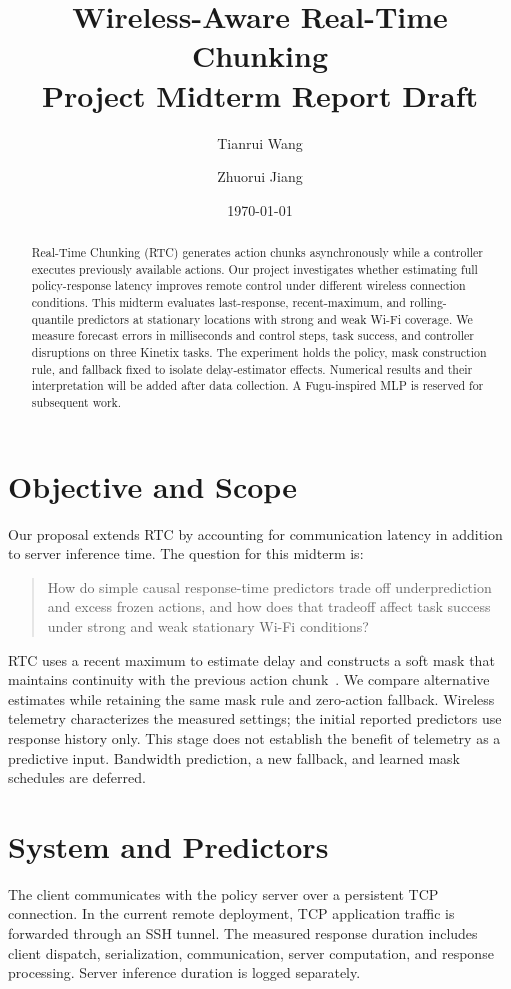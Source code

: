 \documentclass[11pt]{article}
\title{Wireless-Aware Real-Time Chunking\\Project Midterm Report Draft}
\author{Tianrui Wang \and Zhuorui Jiang}
\date{\today}
\begin{document}
\maketitle

\begin{abstract}
Real-Time Chunking (RTC) generates action chunks asynchronously while a controller executes previously available actions. Our project investigates whether estimating full policy-response latency improves remote control under different wireless connection conditions. This midterm evaluates last-response, recent-maximum, and rolling-quantile predictors at stationary locations with strong and weak Wi-Fi coverage. We measure forecast errors in milliseconds and control steps, task success, and controller disruptions on three Kinetix tasks. The experiment holds the policy, mask construction rule, and fallback fixed to isolate delay-estimator effects. Numerical results and their interpretation will be added after data collection. A Fugu-inspired MLP is reserved for subsequent work.
\end{abstract}

\section{Objective and Scope}
Our proposal extends RTC by accounting for communication latency in addition to server inference time. The question for this midterm is:
\begin{quote}
How do simple causal response-time predictors trade off underprediction and excess frozen actions, and how does that tradeoff affect task success under strong and weak stationary Wi-Fi conditions?
\end{quote}
RTC uses a recent maximum to estimate delay and constructs a soft mask that maintains continuity with the previous action chunk~\cite{rtc}. We compare alternative estimates while retaining the same mask rule and zero-action fallback. Wireless telemetry characterizes the measured settings; the initial reported predictors use response history only. This stage does not establish the benefit of telemetry as a predictive input. Bandwidth prediction, a new fallback, and learned mask schedules are deferred.

\section{System and Predictors}
The client communicates with the policy server over a persistent TCP connection. In the current remote deployment, TCP application traffic is forwarded through an SSH tunnel. The measured response duration includes client dispatch, serialization, communication, server computation, and response processing. Server inference duration is logged separately.
\end{document}
